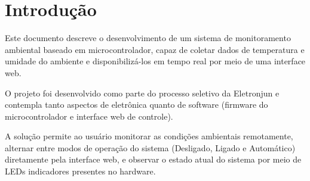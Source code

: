 
\section{Introdução}


Este documento descreve o desenvolvimento de um sistema de monitoramento ambiental
baseado em microcontrolador, capaz de coletar dados de temperatura e umidade do ambiente
e disponibilizá-los em tempo real por meio de uma interface web.

O projeto foi desenvolvido como parte do processo seletivo da Eletronjun e contempla tanto aspectos de eletrônica quanto de software (firmware
do microcontrolador e interface web de controle).

A solução permite ao usuário monitorar as condições ambientais remotamente, alternar
entre modos de operação do sistema (Desligado, Ligado e Automático) diretamente
pela interface web, e observar o estado atual do sistema por meio de LEDs indicadores
presentes no hardware.
